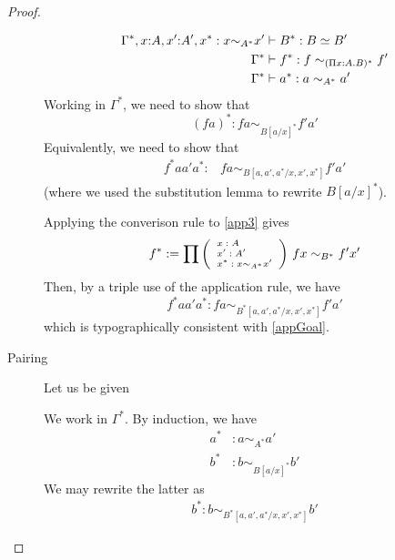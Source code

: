 \documentclass[10pt]{article}
\newcommand{\eeq}{\simeq}
\newcommand{\tripar}[3]{
{\scriptsize \left(
  \begin{array}{l}
    {#1}\\
    {#2}\\
    {#3}
  \end{array}
\right)}}
\begin{document}
\begin{proof}
\begin{description}
\begin{align}
\notag \Gamma^*, x{:}A, x'{:}A', x^* : x {\sim_{A^*}} x' &\vdash B^* : B \eeq B'\\
\Gamma^* &\vdash f^* : f \sim_{(\Pi x{:}A.B)^*} f' \label{app3}\\
\notag \Gamma^* &\vdash a^* : a \sim_{A^*} a'
\end{align}
Working in $\Gamma^*$, we need to show that
\[(fa)^* : fa \sim_{B[a/x]^*} f'a'\]
Equivalently, we need to show that
\begin{align}
  f^* a a' a^* : &fa \sim_{B[a,a',a^*/x,x',x^*]} f'a' \label{appGoal}
\end{align}
(where we used the substitution lemma to rewrite $B[a/x]^*$).

Applying the converison rule to \eqref{app3} gives
\[f^* : = \prod \tripar{x:A}{x':A'}{x^* : x {\sim_{A^*}} x'} \ fx \sim_{B^*}
f'x'\]
Then, by a triple use of the application rule, we have
\[f^* a a' a^* : f a \sim_{B^*[a,a',a^*/x,x',x^*]} f' a' \]
which is typographically consistent with \eqref{appGoal}.
\item[Pairing] Let us be given
\begin{prooftree}
\end{prooftree}
We work in $\Gamma^*$.  By induction, we have
\begin{align*}
  a^* &: a \sim_{A^*} a'\\
  b^* &: b \sim_{B[a/x]^*} b'
\end{align*}
We may rewrite the latter as
\begin{align}
  \label{Btyp}
b^* :  b \sim_{B^*[a,a',a^*/x,x',x^*]} b'
\end{align}


\end{description}
\end{proof}
\end{document}
